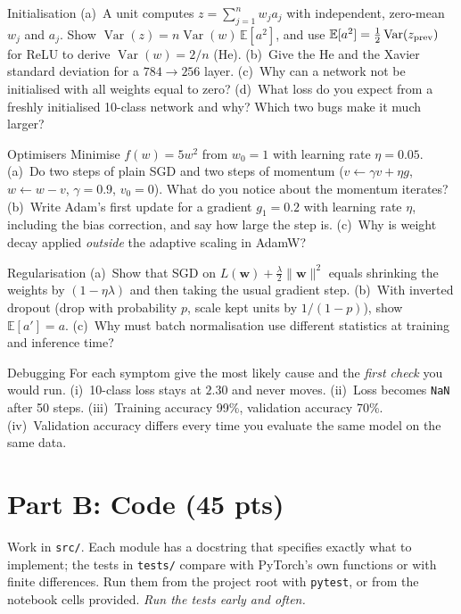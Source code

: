 \documentclass[11pt,a4paper]{article}
\begin{document}
\begin{problem}[4 pts]{Initialisation}
(a)~A unit computes $z=\sum_{j=1}^{n}w_ja_j$ with independent, zero-mean $w_j$ and $a_j$. Show $\operatorname{Var}(z)=n\operatorname{Var}(w)\,\mathbb E[a^2]$, and use $\mathbb E[a^2]=\tfrac12\operatorname{Var}(z_{\rm prev})$ for ReLU to derive $\operatorname{Var}(w)=2/n$ (He).
(b)~Give the He and the Xavier standard deviation for a $784\to256$ layer. (c)~Why can a network not be initialised with all weights equal to zero? (d)~What loss do you expect from a freshly initialised 10-class network and why? Which two bugs make it much larger?
\end{problem}

\begin{problem}[4 pts]{Optimisers}
Minimise $f(w)=5w^2$ from $w_0=1$ with learning rate $\eta=0.05$. (a)~Do two steps of plain SGD and two steps of momentum ($v\leftarrow\gamma v+\eta g$, $w\leftarrow w-v$, $\gamma=0.9$, $v_0=0$). What do you notice about the momentum iterates?
(b)~Write Adam's first update for a gradient $g_1=0.2$ with learning rate $\eta$, including the bias correction, and say how large the step is. (c)~Why is weight decay applied \emph{outside} the adaptive scaling in AdamW?
\end{problem}

\begin{problem}[3 pts]{Regularisation}
(a)~Show that SGD on $L(\mathbf w)+\frac\lambda2\|\mathbf w\|^2$ equals shrinking the weights by $(1-\eta\lambda)$ and then taking the usual gradient step. (b)~With inverted dropout (drop with probability $p$, scale kept units by $1/(1-p)$), show $\mathbb E[a']=a$.
(c)~Why must batch normalisation use different statistics at training and inference time?
\end{problem}

\begin{problem}[2 pts]{Debugging}
For each symptom give the most likely cause and the \emph{first check} you would run. (i)~10-class loss stays at $2.30$ and never moves. (ii)~Loss becomes \texttt{NaN} after 50 steps. (iii)~Training accuracy 99\%, validation accuracy 70\%. (iv)~Validation accuracy differs every time you evaluate the same model on the same data.
\end{problem}

\section{Part B: Code (45 pts)}\label{sec:code}
Work in \texttt{src/}. Each module has a docstring that specifies exactly what to implement; the tests in \texttt{tests/} compare with PyTorch's own functions or with finite differences.
Run them from the project root with \texttt{pytest}, or from the notebook cells provided. \emph{Run the tests early and often.}
\end{document}
